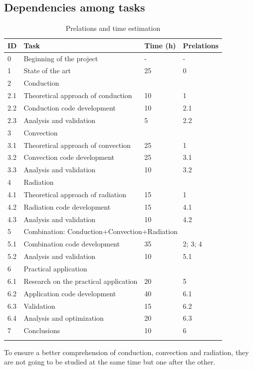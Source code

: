 \subsection{Dependencies among tasks}
\begin{longtable}{ | p{1.3cm} | p{7cm} | p{3cm} | p{3.5cm} |}
\hline

\textbf{ID }& \textbf{Task} & \textbf{Time (h)} & \textbf{Prelations} \\ \hline
0 & Beginning of the project & - & -  \\ \hline
1 & State of the art & 25 & 0 \\ \hline
2 & \multicolumn{3}{|l|}{Conduction} \\ \hline
2.1 & Theoretical approach of conduction & 10 & 1 \\ \hline
2.2 & Conduction code development & 10 & 2.1 \\ \hline
2.3 & Analysis and validation & 5 & 2.2 \\ \hline
3 & \multicolumn{3}{|l|}{Convection} \\ \hline
3.1 & Theoretical approach of convection & 25 & 1 \\ \hline
3.2 & Convection code development & 25 & 3.1 \\ \hline
3.3 & Analysis and validation & 10 & 3.2 \\ \hline
4 & \multicolumn{3}{|l|}{Radiation} \\ \hline
4.1 & Theoretical approach of radiation & 15 & 1 \\ \hline
4.2 & Radiation code development & 15 & 4.1 \\ \hline
4.3 & Analysis and validation & 10 & 4.2 \\ \hline
5 & \multicolumn{3}{|l|}{Combination: Conduction+Convection+Radiation} \\ \hline
5.1 & Combination code development & 35 & 2; 3; 4 \\ \hline
5.2 & Analysis and validation & 10 & 5.1 \\ \hline
6 & \multicolumn{3}{|l|}{Practical application} \\ \hline
6.1 & Research on the practical application & 20 & 5 \\ \hline
6.2 & Application code development & 40 & 6.1  \\ \hline
6.3 & Validation & 15 & 6.2 \\ \hline
6.4 & Analysis and optimization  & 20 & 6.3 \\ \hline
7 & Conclusions & 10 & 6 \\ \hline
\caption{Prelations and time estimation} \\
\end{longtable}
To ensure a better comprehension of conduction, convection and radiation, they are not going to be studied at the same time but one after the other. 

